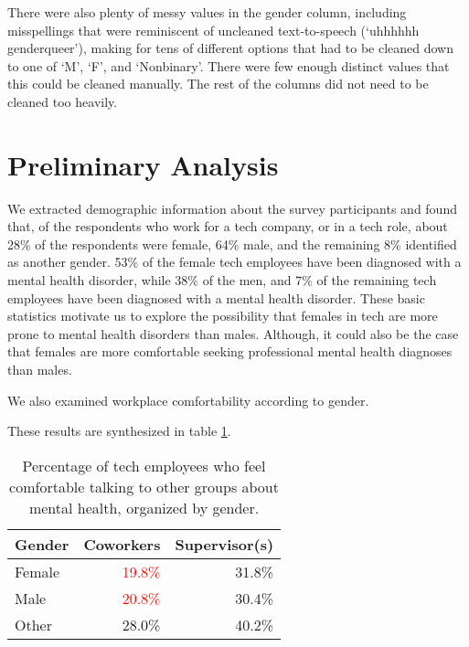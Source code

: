 \documentclass[times, twocolumn]{article}
\begin{document}
There were also plenty of messy values in the gender column, including misspellings
that were reminiscent of uncleaned text-to-speech (‘uhhhhhh genderqueer’),
making for tens of different options that had to be cleaned down to one of
‘M’, ‘F’, and ‘Nonbinary’. There were few enough distinct values that this could
be cleaned manually. The rest of the columns did not need to be cleaned too heavily.


\section{Preliminary Analysis}

We extracted demographic information about the survey participants and found that,
of the respondents who work for a tech company, or in a tech role, about 28\% of
the respondents were female, 64\% male, and the remaining 8\% identified as another
gender. 53\% of the female tech employees have been diagnosed with a mental health
disorder, while 38\% of the men, and 7\% of the remaining tech employees have been
diagnosed with a mental health disorder. These basic statistics motivate us to
explore the possibility that females in tech are more prone to mental health
disorders than males. Although, it could also be the case that females are more
comfortable seeking professional mental health diagnoses than males.

We also examined workplace comfortability according to gender.


These results are
synthesized in table \ref{table:comfort-percentage-table}.


\begin{table}
    \centering
    \begin{tabular}{lrr}
        \hline \textbf{Gender} & \textbf{Coworkers} & \textbf{Supervisor(s)} \\ \hline
        Female & \textcolor{red}{19.8\%} & 31.8\% \\
        Male & \textcolor{red}{20.8\%} & 30.4\% \\
        Other & 28.0\% & \textcolor{GoodGreen}{40.2\%} \\
        \hline
    \end{tabular}
    \caption{
        Percentage of tech employees who feel comfortable talking to other groups
        about mental health, organized by gender.
    }
    \label{table:comfort-percentage-table}
\end{table}
\end{document}
